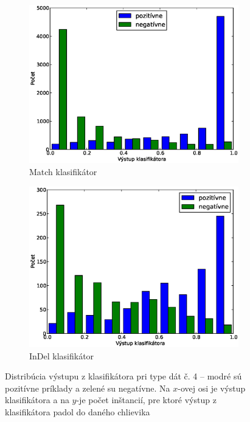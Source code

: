 \begin{figure}[htp]
        \centering
        \begin{subfigure}[t]{0.4\textwidth}
                \includegraphics[width=\textwidth]{images/clf_fi/randomforest_combined_5_test}
                \caption{Match klasifikátor}
                \label{fig:datatype4-out-m}
        \end{subfigure}%
        \qquad\qquad %
        \begin{subfigure}[t]{0.4\textwidth}
                \includegraphics[width=\textwidth]{images/clf_fi/randomforest_combined_5_indel_test}
                \caption{InDel klasifikátor}
                \label{fig:datatype4-out-i}
        \end{subfigure}
        \caption[Distribúcia výstupu z klasifikátora pri type dát č. 4]{Distribúcia výstupu z klasifikátora pri type dát č. 4 -- modré sú pozitívne príklady a zelené su negatívne. Na $x$-ovej osi je výstup klasifikátora a na $y$-je počet inštancií, pre ktoré výstup z klasifikátora padol do daného chlievika}
        \label{fig:datatype4-out}
\end{figure}

